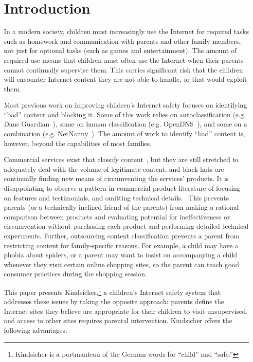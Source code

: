 

\vspace{20mm}

\section{Introduction}
\nopagebreak
In a modern society, children must increasingly use the Internet for required
tasks such as homework and communication with parents and other family
members, not just for optional tasks (such as games and entertainment).
%
The amount of required use means that children must often use the Internet
when their parents cannot continually supervise them.
%
This carries significant risk that the children will encounter Internet
content they are not able to handle, or that would exploit them.

Most previous work on improving children's Internet safety focuses on
identifying ``bad'' content and blocking it. Some of this work relies
on autoclassification (e.g. Dans Guardian~\cite{dansguardian}), some on
human classification (e.g. OpenDNS~\cite{opendns}), and some on a
combination (e.g. NetNanny~\cite{netnanny}).
%
The amount of work to identify ``bad'' content is, however, beyond the
capabilities of most families.

Commercial services exist that classify content~\cite{opendns, netnanny},
but they are still stretched to adequately deal with the volume of legitimate
content, and black hats are continually finding new means of circumventing the
services' products.
%
It is disappointing to observe a pattern in commercial product literature of
focusing on features and testimonials, and omitting technical
details.~\cite{opendns, kidlogger, mcafee}
%
This prevents parents (or a technically inclined friend of the parents) from
making a rational comparison between products and evaluating potential for
ineffectiveness or circumvention without purchasing each product and
performing detailed technical experiments.
%
Further, outsourcing content classification prevents a parent from restricting
content for family-specific reasons.
%
For example, a child may have a phobia about spiders, or a parent may want to
insist on accompanying a child whenever they visit certain online shopping
sites, so the parent can teach good consumer practices during the shopping
session.

This paper presents Kindsicher,\footnote{Kindsicher is a portmanteau of the
German words for ``child'' and ``safe.''} a children's Internet safety system
that addresses these issues by taking the opposite approach: 
%
parents define the Internet sites they believe are appropriate for their
children to visit unsupervised, and access to other sites requires parental
intervention.
%
Kindsicher offers the following advantages:

